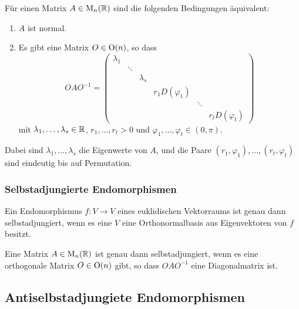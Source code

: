 \begin{corollary}
  Für einen Matrix $A \in \mathrm{M}_n(\mathbb{R})$ sind die folgenden Bedingungen äquivalent:
  \begin{enumerate}[leftmargin=*, label=\roman*)]
    \item
      $A$ ist normal.
    \item
      Es gibt eine Matrix $O \in \mathrm{O}(n)$, so dass 
      \[
        O A O^{-1}
        =
        \begin{pmatrix}
          \lambda_1 &         &           &                   &         &                   \\
                    & \ddots  &           &                   &         &                   \\
                    &         & \lambda_s &                   &         &                   \\
                    &         &           & r_1 D(\varphi_1)  &         &                   \\
                    &         &           &                   & \ddots  &                   \\
                    &         &           &                   &         & r_t D(\varphi_t)
        \end{pmatrix}
      \]
      mit $\lambda_1, \dotsc, \lambda_s \in \mathbb{R}$, $r_1, \dotsc, r_t > 0$ und $\varphi_1, \dotsc, \varphi_t \in (0, \pi)$.
  \end{enumerate}
  Dabei sind $\lambda_1, \dotsc, \lambda_s$ die Eigenwerte von $A$, und die Paare $(r_1, \varphi_1), \dotsc, (r_t, \varphi_t)$ sind eindeutig bis auf Permutation.
\end{corollary}


\subsubsection{Selbstadjungierte Endomorphismen}


\begin{proposition}
  Ein Endomorphismus $f \colon V \to V$ eines euklidischen Vektorraums ist genau dann selbstadjungiert, wenn es eine $V$ eine Orthonormalbasis aus Eigenvektoren von $f$ besitzt.
\end{proposition}


\begin{corollary}
  Eine Matrix $A \in \mathrm{M}_n(\mathbb{R})$ ist genau dann selbstadjungiert, wenn es eine orthogonale Matrix $O \in \mathrm{O}(n)$ gibt, so dass $O A O^{-1}$ eine Diagonalmatrix ist.
\end{corollary}


\subsection{Antiselbstadjungiete Endomorphismen}
























